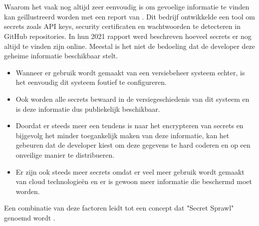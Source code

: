 \section{}%
\label{sec:Kwetsbaarheden en aanvallen om secrets te extraheren}

\subsection{}
\label{sec:Secret Sprawl}
Waarom het vaak nog altijd zeer eenvoudig is om gevoelige informatie te vinden kan geïllustreerd worden met een report van \Textcite{GitGuardian2021}. Dit bedrijf ontwikkelde een tool om secrets zoals API keys, security certificaten en wachtwoorden te detecteren in GitHub repositories. In hun 2021 rapport werd beschreven hoeveel secrets er nog altijd te vinden zijn online. Meestal is het niet de bedoeling dat de developer deze geheime informatie beschikbaar stelt.

\begin{itemize}
  \item Wanneer er gebruik wordt gemaakt van een versiebeheer systeem echter, is het eenvoudig dit systeem foutief te configureren.
  \item Ook worden alle secrets bewaard in de versiegeschiedenis van dit systeem en is deze informatie dus publiekelijk beschikbaar.
  \item Doordat er steeds meer een tendens is naar het encrypteren van secrets en bijgevolg het minder toegankelijk maken van deze informatie, kan het gebeuren dat de developer kiest om deze gegevens te hard coderen en op een onveilige manier te distribueren.
  \item Er zijn ook steeds meer secrets omdat er veel meer gebruik wordt gemaakt van cloud technologieën en er is gewoon meer informatie die beschermd moet worden.
\end{itemize}
Een combinatie van deze factoren leidt tot een concept dat "Secret Sprawl" genoemd wordt \autocite{GitGuardian2021}.
\clearpage


